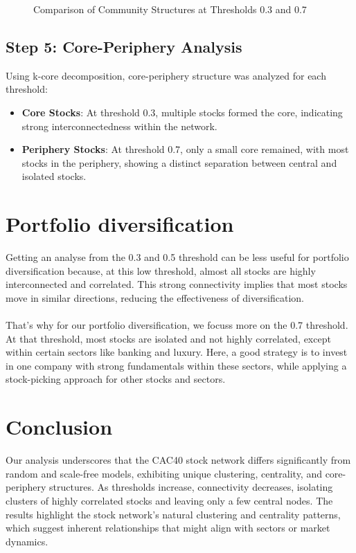 \documentclass[12pt]{article}
\begin{document}
\begin{figure}[H]
\begin{minipage}[b]{0.45\textwidth}
        \label{fig:louvain_07}
    \end{minipage}
    \caption{Comparison of Community Structures at Thresholds 0.3 and 0.7}
    \label{fig:community_structures}
\end{figure}
\subsection{Step 5: Core-Periphery Analysis}
Using k-core decomposition, core-periphery structure was analyzed for each threshold:
\begin{itemize}
    \item \textbf{Core Stocks}: At threshold 0.3, multiple stocks formed the core, indicating strong interconnectedness within the network.
    \item \textbf{Periphery Stocks}: At threshold 0.7, only a small core remained, with most stocks in the periphery, showing a distinct separation between central and isolated stocks.
\end{itemize}

\section{Portfolio diversification}
Getting an analyse from the 0.3 and 0.5 threshold can be less useful for portfolio diversification because, at this low threshold, almost all stocks are highly interconnected and correlated. This strong connectivity implies that most stocks move in similar directions, reducing the effectiveness of diversification.\\\\
That's why for our portfolio diversification, we focuss more on the 0.7 threshold. At that threshold, most stocks are isolated and not highly correlated, except within certain sectors like banking and luxury. Here, a good strategy is to invest in one company with strong fundamentals within these sectors, while applying a stock-picking approach for other stocks and sectors.

\section{Conclusion}

Our analysis underscores that the CAC40 stock network differs significantly from random and scale-free models, exhibiting unique clustering, centrality, and core-periphery structures. As thresholds increase, connectivity decreases, isolating clusters of highly correlated stocks and leaving only a few central nodes. The results highlight the stock network's natural clustering and centrality patterns, which suggest inherent relationships that might align with sectors or market dynamics.
\end{document}
